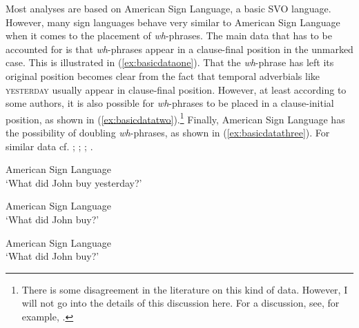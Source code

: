 Most analyses are based on American Sign Language, a basic SVO language. However, many sign languages behave very similar to American Sign Language when it comes to the placement of \textit{wh}-phrases. The main data that has to be accounted for is that \textit{wh}-phrases appear in a clause-final position in the unmarked case. This is illustrated in (\ref{ex:basicdataone}). That the \textit{wh}-phrase has left its original position becomes clear from the fact that temporal adverbials like \textsc{yesterday} usually appear in clause-final position. However, at least according to some authors, it is also possible for \textit{wh}-phrases to be placed in a clause-initial position, as shown in (\ref{ex:basicdatatwo}).\footnote{ There is some disagreement in the literature on this kind of data. However, I will not go into the details of this discussion here. For a discussion, see, for example, \citet[445--447]{sandler2006sign}.} Finally, American Sign Language has the possibility of doubling \textit{wh}-phrases, as shown in (\ref{ex:basicdatathree}). For similar data cf. \citet[26]{petronio1997}; \citet{lillo2006position}; \citet[110--115]{neidle2000syntax}; \citet[664]{pichler}.

\begin{exe}
\ex American Sign Language \\
%
\glt `What did John buy yesterday?' \label{ex:basicdataone} 
\end{exe}

\begin{exe}
\ex American Sign Language \\ 
%
\glt `What did John buy?' \label{ex:basicdatatwo} 
\end{exe}

\begin{exe}
\ex American Sign Language \\
%
\glt `What did John buy?' \label{ex:basicdatathree} 
\end{exe}

